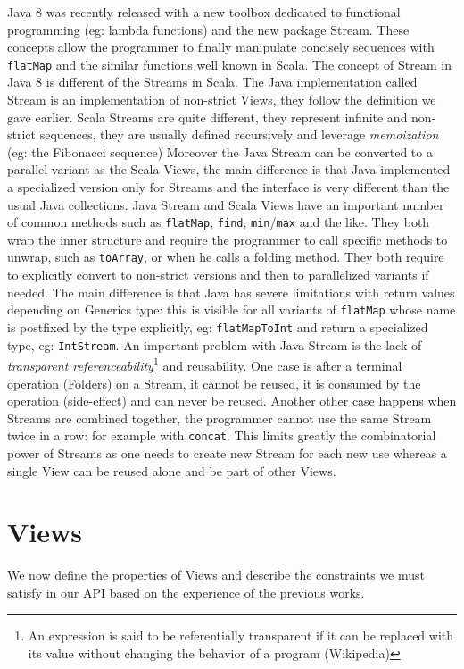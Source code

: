 \documentclass[a4paper,12pt,twocolumn]{article}
\begin{document}
Java 8 was recently released with a new toolbox dedicated to functional programming (eg: lambda functions) and the new package Stream.
These concepts allow the programmer to finally manipulate concisely sequences with \verb|flatMap| and the similar functions well known in Scala.
The concept of Stream in Java 8 is different of the Streams in Scala.
The Java implementation called Stream is an implementation of non-strict Views, they follow the definition we gave earlier.
Scala Streams are quite different, they represent infinite and non-strict sequences, they are usually defined recursively and leverage {\it memoization} (eg: the Fibonacci sequence)
Moreover the Java Stream can be converted to a parallel variant as the Scala Views, the main difference is that Java implemented a specialized version only for Streams and the interface is very different than the usual Java collections.
Java Stream and Scala Views have an important number of common methods such as \verb|flatMap|, \verb|find|, \verb|min|/\verb|max| and the like.
They both wrap the inner structure and require the programmer to call specific methods to unwrap, such as \verb|toArray|, or when he calls a folding method.
They both require to explicitly convert to non-strict versions and then to parallelized variants if needed.
The main difference is that Java has severe limitations with return values depending on Generics type: this is visible for all variants of \verb|flatMap| whose name is postfixed by the type explicitly, eg: \verb|flatMapToInt| and return a specialized type, eg: \verb|IntStream|.
An important problem with Java Stream is the lack of {\it transparent referenceability}\footnote{An expression is said to be referentially transparent if it can be replaced with its value without changing the behavior of a program (Wikipedia)} and reusability.
One case is after a terminal operation (Folders) on a Stream, it cannot be reused, it is consumed by the operation (side-effect) and can never be reused.
Another other case happens when Streams are combined together, the programmer cannot use the same Stream twice in a row: for example with \verb|concat|.
This limits greatly the combinatorial power of Streams as one needs to create new Stream for each new use whereas a single View can be reused alone and be part of other Views.

\section{Views}
We now define the properties of Views and describe the constraints we must satisfy in our API based on the experience of the previous works.
\end{document}
